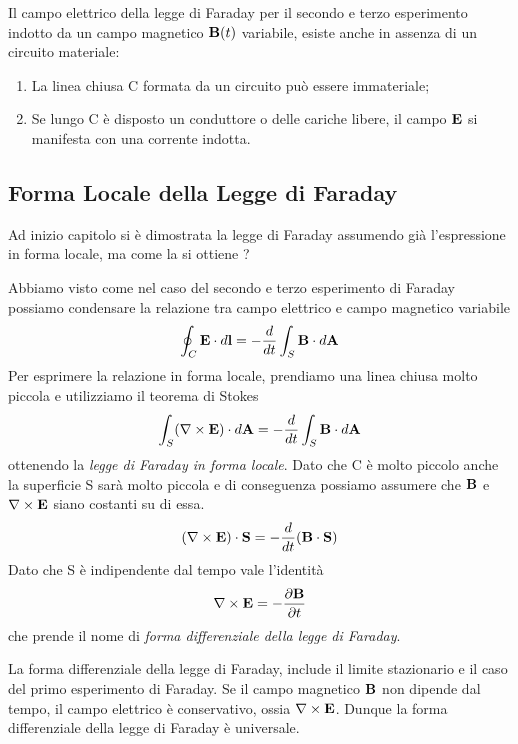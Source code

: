 Il campo elettrico della legge di Faraday per il secondo e terzo esperimento indotto da un campo magnetico $\bold{B}(t)$ variabile, esiste anche in assenza di un circuito materiale:
\begin{enumerate}
	\item La linea chiusa C formata da un circuito pu\`o essere immateriale;
	\item Se lungo C \`e disposto un conduttore o delle cariche libere, il campo $\bold{E}$ si manifesta con una corrente indotta.
\end{enumerate}

\subsection{Forma Locale della Legge di Faraday}
Ad inizio capitolo si \`e dimostrata la legge di Faraday assumendo gi\`a l'espressione in forma locale, ma come la si ottiene ?

Abbiamo visto come nel caso del secondo e terzo esperimento di Faraday possiamo condensare la relazione tra campo elettrico e campo magnetico variabile 
\begin{equation*}
	\oint_{C} \bold{E} \cdot d\bold{l} = - \frac{d}{dt} \int_{S} \bold{B} \cdot d\bold{A}
\end{equation*}
Per esprimere la relazione in forma locale, prendiamo una linea chiusa molto piccola e utilizziamo il teorema di Stokes 
\begin{equation*}
	\int_{S} (\nabla \times \bold{E}) \cdot d\bold{A} = - \frac{d}{dt} \int_{S} \bold{B} \cdot d\bold{A}
\end{equation*}
ottenendo la \textit{legge di Faraday in forma locale}. Dato che C \`e molto piccolo anche la superficie S sar\`a molto piccola e di conseguenza possiamo assumere che $\bold{B}$ e $\nabla \times \bold{E}$ siano costanti su di essa.
\begin{equation*}
	(\nabla \times \bold{E}) \cdot \bold{S} = - \frac{d}{dt}(\bold{B} \cdot \bold{S})
\end{equation*}
Dato che S \`e indipendente dal tempo vale l'identit\`a 
\begin{equation*}
	\nabla \times \bold{E} = - \frac{\partial \bold{B}}{\partial t}
\end{equation*}
che prende il nome di \textit{forma differenziale della legge di Faraday}.

La forma differenziale della legge di Faraday, include il limite stazionario e il caso del primo esperimento di Faraday. Se il campo magnetico $\bold{B}$ non dipende dal tempo, il campo elettrico \`e conservativo, ossia $\nabla \times \bold{E}$. Dunque la forma differenziale della legge di Faraday \`e universale.


